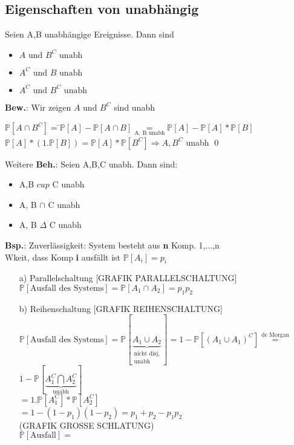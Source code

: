 \subsection{Eigenschaften von unabhängig}
Seien A,B unabhängige Ereignisse. Dann sind
\begin{itemize}
	\item $A \text{ und } B^C \text{ unabh}$
	\item $A^C \text{ und } B \text{ unabh}$
	\item $A^C \text{ und } B^C \text{ unabh}$
\end{itemize}
\textbf{Bew.}: Wir zeigen $A \text{ und } B^C$ sind unabh
\begin{tabbing}
	$\mathds{P}[A\cap B^C] =$\=$ \mathds{P}[A]-\mathds{P}[A\cap B]\underset{\text{A, B unabh}}{=}\mathds{P}[A] - \mathds{P}[A]*\mathds{P}[B]$\\
	\>$\mathds{P}[A]*(1.\mathds{P}[B])=\mathds{P}[A]*\mathds{P}[B^C] \Rightarrow A, B^C $ unabh \qed
\end{tabbing}
Weitere \textbf{Beh.}: Seien A,B,C unabh. Dann sind:
\begin{itemize}
	\item A,B $cup$ C unabh 
	\item A, B $\cap$ C unabh
	\item A, B $\Delta$ C unabh
\end{itemize}
\textbf{Bsp.}: Zuverlässigkeit: System besteht aus \textbf{n} Komp. 1,...,n\\
Wkeit, dass Komp \textbf{i} ausfällt ist $\mathds{P}[A_i]=p_i$
\begin{enumerate}
	\item [a)] Parallelschaltung [GRAFIK PARALLELSCHALTUNG]\\
	$\mathds{P}[\text{Ausfall des Systems}] = \mathds{P}[A_1\cap A_2] = p_1p_2$
	\item [b)] Reihenschaltung [GRAFIK REIHENSCHALTUNG]\\
	$\mathds{P}[\text{Ausfall des Systems}]= \mathds{P}[\underbrace{A_1 \cup A_2}_{\substack{\text{nicht disj,}\\\text{unabh}}}] = 1-\mathds{P}[(A_1 \cup A_1)^C]\overset{\text{de Morgan}}{=}$\smallskip\\
	$1-\mathds{P}[\underbrace{A_1^C \bigcap A_2^C}_\text{unabh}]$\smallskip\\
	$=1.\mathds{P}[A_1^C]*\mathds{P}[A_2^C]$\smallskip\\
	$=1-(1-p_1)(1-p_2)=p_1+p_2 - p_1p_2$\medskip\\
	(GRAFIK GROSSE SCHLATUNG)\\
	$\mathds{P}[\text{Ausfall}] = $
\end{enumerate}
